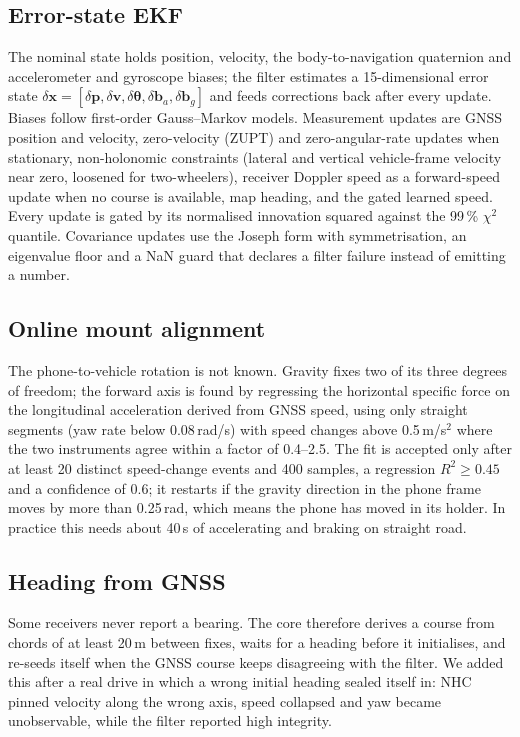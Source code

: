 \documentclass[conference]{IEEEtran}
\begin{document}
\subsection{Error-state EKF}
The nominal state holds position, velocity, the body-to-navigation quaternion
and accelerometer and gyroscope biases; the filter estimates a 15-dimensional
error state $\delta\mathbf{x} = [\delta\mathbf{p}, \delta\mathbf{v},
\delta\boldsymbol{\theta}, \delta\mathbf{b}_a, \delta\mathbf{b}_g]$ and feeds
corrections back after every update. Biases follow first-order Gauss--Markov
models. Measurement updates are GNSS position and velocity, zero-velocity
(ZUPT) and zero-angular-rate updates when stationary, non-holonomic constraints
(lateral and vertical vehicle-frame velocity near zero, loosened for
two-wheelers), receiver Doppler speed as a forward-speed update when no course
is available, map heading, and the gated learned speed. Every update is gated
by its normalised innovation squared against the 99\,\% $\chi^2$ quantile.
Covariance updates use the Joseph form with symmetrisation, an eigenvalue floor
and a NaN guard that declares a filter failure instead of emitting a number.

\subsection{Online mount alignment}
The phone-to-vehicle rotation is not known. Gravity fixes two of its three
degrees of freedom; the forward axis is found by regressing the horizontal
specific force on the longitudinal acceleration derived from GNSS speed, using
only straight segments (yaw rate below 0.08\,rad/s) with speed changes above
0.5\,m/s$^2$ where the two instruments agree within a factor of 0.4--2.5. The
fit is accepted only after at least 20 distinct speed-change events and 400
samples, a regression $R^2 \geq 0.45$ and a confidence of 0.6; it restarts if
the gravity direction in the phone frame moves by more than 0.25\,rad, which
means the phone has moved in its holder. In practice this needs about 40\,s of
accelerating and braking on straight road.

\subsection{Heading from GNSS}
Some receivers never report a bearing. The core therefore derives a course from
chords of at least 20\,m between fixes, waits for a heading before it
initialises, and re-seeds itself when the GNSS course keeps disagreeing with
the filter. We added this after a real drive in which a wrong initial heading
sealed itself in: NHC pinned velocity along the wrong axis, speed collapsed and
yaw became unobservable, while the filter reported high integrity.
\end{document}
